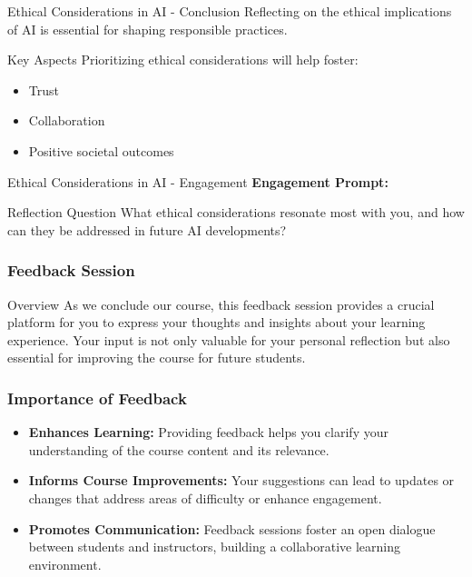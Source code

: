 \documentclass[aspectratio=169]{beamer}
\begin{document}
\begin{frame}[fragile]{Ethical Considerations in AI - Conclusion}
    Reflecting on the ethical implications of AI is essential for shaping responsible practices. 
    \begin{block}{Key Aspects}
        Prioritizing ethical considerations will help foster:
        \begin{itemize}
            \item Trust
            \item Collaboration
            \item Positive societal outcomes
        \end{itemize}
    \end{block}
\end{frame}

\begin{frame}[fragile]{Ethical Considerations in AI - Engagement}
    \textbf{Engagement Prompt:}
    \begin{block}{Reflection Question}
        What ethical considerations resonate most with you, and how can they be addressed in future AI developments?
    \end{block}
\end{frame}

\begin{frame}[fragile]
    \frametitle{Feedback Session}
    \begin{block}{Overview}
        As we conclude our course, this feedback session provides a crucial platform for you to express your thoughts and insights about your learning experience. Your input is not only valuable for your personal reflection but also essential for improving the course for future students.
    \end{block}
\end{frame}

\begin{frame}[fragile]
    \frametitle{Importance of Feedback}
    \begin{itemize}
        \item \textbf{Enhances Learning:} Providing feedback helps you clarify your understanding of the course content and its relevance.
        \item \textbf{Informs Course Improvements:} Your suggestions can lead to updates or changes that address areas of difficulty or enhance engagement.
        \item \textbf{Promotes Communication:} Feedback sessions foster an open dialogue between students and instructors, building a collaborative learning environment.
    \end{itemize}
\end{frame}
\end{document}
